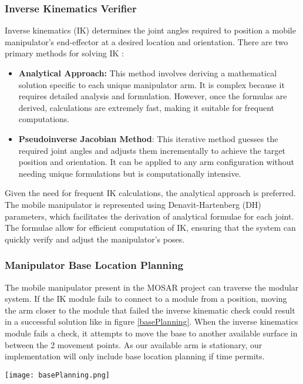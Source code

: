 \subsubsection{Inverse Kinematics Verifier}\label{IKDESIGN}
Inverse kinematics (IK) determines the joint angles required to position a mobile manipulator's end-effector at a desired location and orientation. There are two primary methods for solving IK \cite{IK}:
\begin{itemize}[]
	\item\textbf{Analytical Approach:} This method involves deriving a mathematical solution specific to each unique manipulator arm. It is complex because it requires detailed analysis and formulation. However, once the formulas are derived, calculations are extremely fast, making it suitable for frequent computations.
	
	\item\textbf{Pseudoinverse Jacobian Method}: This iterative method guesses the required joint angles and adjusts them incrementally to achieve the target position and orientation. It can be applied to any arm configuration without needing unique formulations but is computationally intensive.
\end{itemize}
Given the need for frequent IK calculations, the analytical approach is preferred. The mobile manipulator is represented using Denavit-Hartenberg (DH)\cite{DenavitHartenberg} parameters, which facilitates the derivation of analytical formulae for each joint. The formulae allow for efficient computation of IK, ensuring that the system can quickly verify and adjust the manipulator's poses.

\subsubsection{Manipulator Base Location Planning}
The mobile manipulator present in the MOSAR \cite{MOSAR} project can traverse the modular system. If the IK module fails to connect to a module from a position, moving the arm closer to the module that failed the inverse kinematic check could result in a successful solution like in figure \ref{basePlanning}. When the inverse kinematics module fails a check, it attempts to move the base to another available surface in between the 2 movement points. As our available arm is stationary, our implementation will only include base location planning if time permits.
\begin{figure*}[h]
	\centering
	\texttt{[image: basePlanning.png]}
	\caption{Inverse kinematic checks performed to verify if it is
		possible to translate a module from position A to position B.
		In the first case (above) this is not possible, but it is solved
		by changing the intermediate position in the second case
		(bottom). Image and text from \cite{9438257}}
	\label{basePlanning}
\end{figure*}

